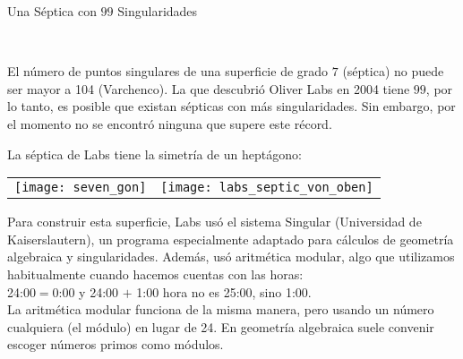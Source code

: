 \documentclass[es]{SurferDesc}%
\begin{document}
\footnotesize
%
\begin{surferPage}
  \begin{surferTitle}Una Séptica con $99$ Singularidades\end{surferTitle} \\
  \begin{surferText}
    El número de puntos singulares de una superficie de grado $7$ (séptica)
    no puede ser mayor a 104 (Varchenco).
    La que descubrió Oliver Labs en 2004 tiene $99$, por lo tanto, es posible 
    que existan sépticas con más singularidades. Sin embargo, por el momento
    no se encontró ninguna que supere este récord.
    
    La séptica de Labs tiene la simetría de un heptágono:  
    
    \vspace*{-0.3em}
    \begin{center}
      \begin{tabular}{c@{\qquad}c}
        \texttt{[image: seven\_gon]}
        &
        \texttt{[image: labs\_septic\_von\_oben]}
      \end{tabular}
    \end{center}
    \vspace*{-0.3em}
    Para construir esta superficie, Labs usó el sistema 
    {\sc Singular} (Universidad de Kaiserslautern), un programa especialmente adaptado
    para cálculos de geometría algebraica y singularidades. 
    Además, usó aritmética modular, algo que utilizamos habitualmente cuando hacemos cuentas con las horas:\\
    24:00$=$0:00 y 24:00 $+$ 1:00 hora no es 25:00, sino 1:00.\\
    La aritmética modular funciona de la misma manera, pero usando un número cualquiera
    (el módulo) en lugar de 24.
    En geometría algebraica suele convenir escoger números primos como módulos.
 
  \end{surferText}
\end{surferPage}

\end{document}
